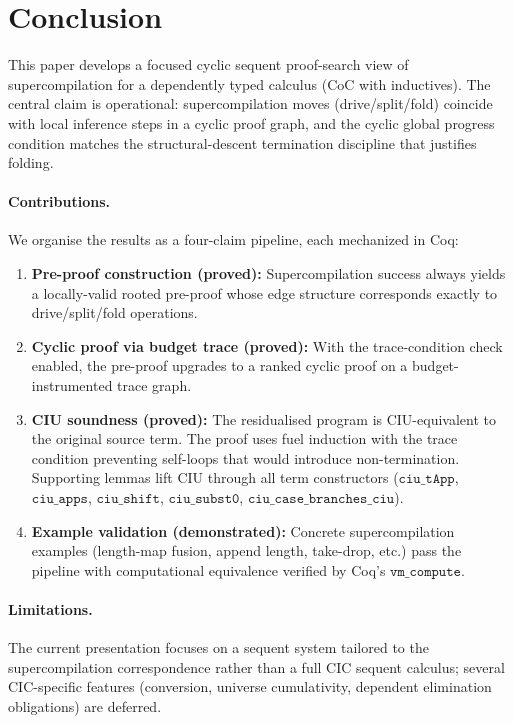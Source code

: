 \section{Conclusion}
\label{sec:conc}

This paper develops a focused cyclic sequent proof-search view of supercompilation for a dependently typed calculus (CoC with inductives).
The central claim is operational: supercompilation moves (drive/split/fold) coincide with local inference steps in a cyclic proof graph, and the cyclic global progress condition matches the structural-descent termination discipline that justifies folding.

\paragraph{Contributions.}
We organise the results as a four-claim pipeline, each mechanized in Coq:
\begin{enumerate}[leftmargin=*]
\item \textbf{Pre-proof construction (proved):} Supercompilation success always yields a locally-valid rooted pre-proof whose edge structure corresponds exactly to drive/split/fold operations.
\item \textbf{Cyclic proof via budget trace (proved):} With the trace-condition check enabled, the pre-proof upgrades to a ranked cyclic proof on a budget-instrumented trace graph.
\item \textbf{CIU soundness (proved):} The residualised program is CIU-equivalent to the original source term. The proof uses fuel induction with the trace condition preventing self-loops that would introduce non-termination. Supporting lemmas lift CIU through all term constructors ($\texttt{ciu\_tApp}$, $\texttt{ciu\_apps}$, $\texttt{ciu\_shift}$, $\texttt{ciu\_subst0}$, $\texttt{ciu\_case\_branches\_ciu}$).
\item \textbf{Example validation (demonstrated):} Concrete supercompilation examples (length-map fusion, append length, take-drop, etc.) pass the pipeline with computational equivalence verified by Coq's $\texttt{vm\_compute}$.
\end{enumerate}

\paragraph{Limitations.}
The current presentation focuses on a sequent system tailored to the supercompilation correspondence rather than a full CIC sequent calculus; several CIC-specific features (conversion, universe cumulativity, dependent elimination obligations) are deferred.


